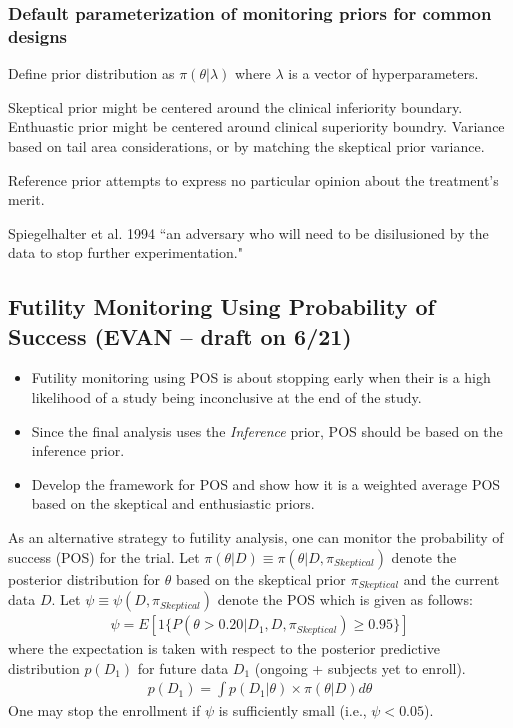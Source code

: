 \documentclass[12pt]{article}
\begin{document}
\subsubsection{Default parameterization of monitoring priors for common designs}\label{monitoring_prior_specification}
Define prior distribution as $\pi(\theta|\lambda)$ where $\lambda$ is a vector of hyperparameters.

Skeptical prior might be centered around the clinical inferiority boundary.
Enthuastic prior might be centered around clinical superiority boundry.
Variance based on tail area considerations, or by matching the skeptical prior variance.

Reference prior attempts to express no particular opinion about the treatment's merit. 

Spiegelhalter et al. 1994 ``an adversary who will need to be disilusioned by the data to stop further experimentation."

\subsection{Futility Monitoring Using Probability of Success (EVAN -- draft on 6/21)}

\begin{itemize}
 \item Futility monitoring using POS is about stopping early when their is a high likelihood
       of a study being inconclusive at the end of the study.
 \item Since the final analysis uses the \textit{Inference} prior, POS should be based on the
       inference prior.
 \item Develop the framework for POS and show how it is a weighted average POS based on the skeptical
       and enthusiastic priors.
\end{itemize}
As an alternative strategy to futility analysis, one can monitor the probability of success (POS) for the trial. Let $\pi(\theta|D)\equiv \pi(\theta|D,\pi_{Skeptical})$ denote the posterior distribution for $\theta$ based on the skeptical prior $\pi_{Skeptical}$ and the current data $D$. Let $\psi\equiv\psi(D,\pi_{Skeptical})$ denote the POS which is given as follows:
\begin{align*}
\psi=E[1\{P(\theta>0.20|D_1,D,\pi_{Skeptical})\geq 0.95\}]
\end{align*}
where the expectation is taken with respect to the posterior predictive distribution $p(D_1)$ for future data $D_1$ (ongoing + subjects yet to enroll).
\begin{align*}
p(D_1)=\int p(D_1|\theta)\times \pi(\theta|D)d\theta
\end{align*}
One may stop the enrollment if $\psi$ is sufficiently small (i.e., $\psi<0.05$).
\end{document}
